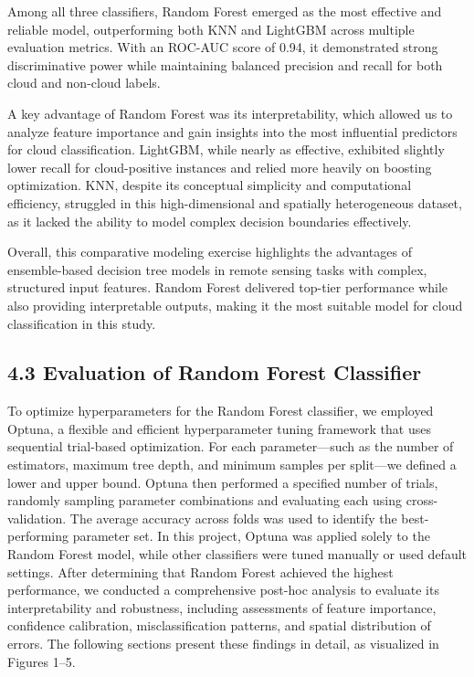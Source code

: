 \documentclass[11pt]{article}
\begin{document}
Among all three classifiers, Random Forest emerged as the most effective
and reliable model, outperforming both KNN and LightGBM across multiple
evaluation metrics. With an ROC-AUC score of 0.94, it demonstrated
strong discriminative power while maintaining balanced precision and
recall for both cloud and non-cloud labels.

A key advantage of Random Forest was its interpretability, which allowed
us to analyze feature importance and gain insights into the most
influential predictors for cloud classification. LightGBM, while nearly
as effective, exhibited slightly lower recall for cloud-positive
instances and relied more heavily on boosting optimization. KNN, despite
its conceptual simplicity and computational efficiency, struggled in
this high-dimensional and spatially heterogeneous dataset, as it lacked
the ability to model complex decision boundaries effectively.

Overall, this comparative modeling exercise highlights the advantages of
ensemble-based decision tree models in remote sensing tasks with
complex, structured input features. Random Forest delivered top-tier
performance while also providing interpretable outputs, making it the
most suitable model for cloud classification in this study.

    \subsection*{4.3 Evaluation of Random Forest
Classifier}\label{evaluation-of-random-forest-classifier}

To optimize hyperparameters for the Random Forest classifier, we
employed Optuna, a flexible and efficient hyperparameter tuning
framework that uses sequential trial-based optimization. For each
parameter---such as the number of estimators, maximum tree depth, and
minimum samples per split---we defined a lower and upper bound. Optuna
then performed a specified number of trials, randomly sampling parameter
combinations and evaluating each using cross-validation. The average
accuracy across folds was used to identify the best-performing parameter
set. In this project, Optuna was applied solely to the Random Forest
model, while other classifiers were tuned manually or used default
settings. After determining that Random Forest achieved the highest
performance, we conducted a comprehensive post-hoc analysis to evaluate
its interpretability and robustness, including assessments of feature
importance, confidence calibration, misclassification patterns, and
spatial distribution of errors. The following sections present these
findings in detail, as visualized in Figures 1--5.
\end{document}
